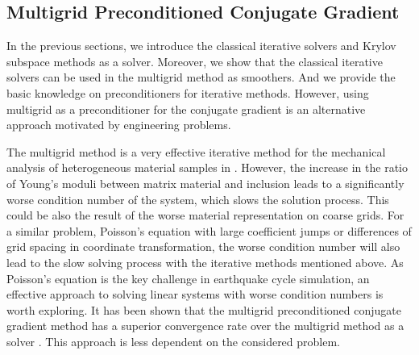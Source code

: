 \subsection{Multigrid Preconditioned Conjugate Gradient}
In the previous sections, we introduce the classical iterative solvers and Krylov subspace methods as a solver. Moreover, we show that the classical iterative solvers can be used in the multigrid method as smoothers. And we provide the basic knowledge on preconditioners for iterative methods. However, using multigrid as a preconditioner for the conjugate gradient is an alternative approach motivated by engineering problems.

The multigrid method is a very effective iterative method for the mechanical analysis of heterogeneous material samples in \cite{hafner2006mesoscale}. However, the increase in the ratio of Young's moduli between matrix material and inclusion leads to a significantly worse condition number of the system, which slows the solution process. This could be also the result of the worse material representation on coarse grids. For a similar problem, Poisson's equation with large coefficient jumps or differences of grid spacing in coordinate transformation, the worse condition number will also lead to the slow solving process with the iterative methods mentioned above. As Poisson's equation is the key challenge in earthquake cycle simulation, an effective approach to solving linear systems with worse condition numbers is worth exploring. It has been shown that the multigrid preconditioned conjugate gradient method has a superior convergence rate over the multigrid method as a solver \cite{tatebe1993multigrid}. This approach is less dependent on the considered problem.


